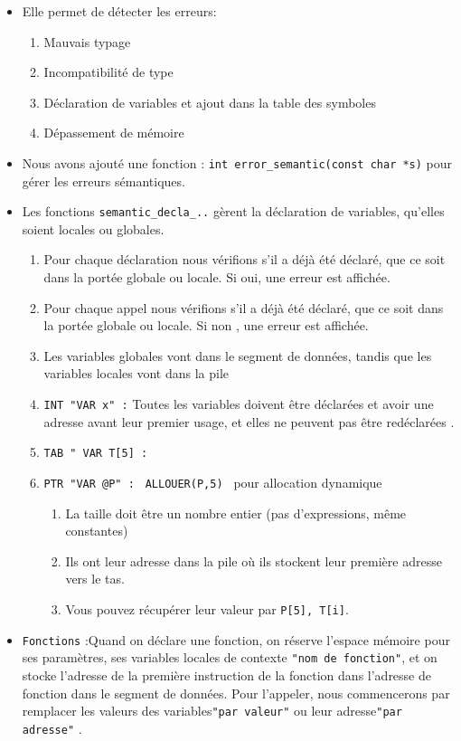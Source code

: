 \documentclass[a4paper,10pt]{article}
\begin{document}
\begin{itemize}
    \item Elle permet de détecter les erreurs:
    \begin{enumerate}
        \item Mauvais typage
        \item Incompatibilité de type
        \item Déclaration de variables et ajout dans la table des symboles
        \item Dépassement de mémoire
    \end{enumerate}
    \item Nous avons ajouté une fonction : \texttt{int error\_semantic(const char *s)} pour gérer les erreurs sémantiques.
    \item Les fonctions \texttt{semantic\_decla\_..} gèrent la déclaration de variables, qu'elles soient locales ou globales.
    \begin{enumerate}
        \item Pour chaque déclaration  nous vérifions s'il a déjà été déclaré, que ce soit dans la portée globale ou locale. Si oui, une erreur est affichée.
        \item Pour chaque appel  nous vérifions s'il a déjà été déclaré, que ce soit dans la portée globale ou locale. Si non , une erreur est affichée.
        \item Les variables globales vont dans le segment de données, tandis que les variables locales vont dans la pile
        \item \texttt{INT "VAR x" :} Toutes les variables doivent être déclarées et avoir une adresse avant leur premier usage, et elles ne peuvent pas être redéclarées .
        \item  \texttt{TAB " VAR T[5] :}
       \item \texttt{PTR "VAR @P" : } \texttt{ALLOUER(P,5) } pour allocation dynamique
            \begin{enumerate}
                \item La taille doit être un nombre entier (pas d'expressions, même constantes)
                \item Ils ont leur adresse dans la pile où ils stockent leur première adresse vers le tas.
                \item Vous pouvez récupérer leur valeur par \texttt{P[5], T[i]}.
            \end{enumerate}


    \end{enumerate}
     \item \texttt {Fonctions} :Quand on déclare une fonction, on réserve l'espace mémoire pour ses paramètres, ses variables locales de contexte \texttt {"nom de fonction"}, et on stocke l'adresse de la première instruction de la fonction dans l'adresse de fonction dans le segment de données. Pour l'appeler, nous commencerons par remplacer les valeurs des variables\texttt {"par valeur"} ou leur adresse\texttt {"par adresse"} .


\end{itemize}
\end{document}
